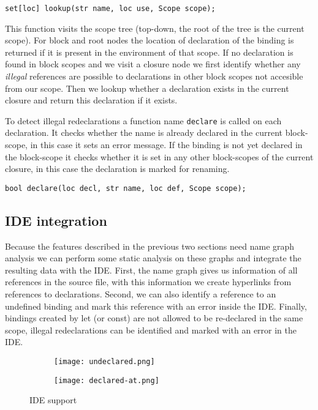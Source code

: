 \begin{lstlisting}[language=rascal]
set[loc] lookup(str name, loc use, Scope scope);
\end{lstlisting}

This function visits the scope tree (top-down, the root of the tree is the current scope). For block and root nodes the location of declaration of the binding is returned if it is present in the environment of that scope. If no declaration is found in block scopes and we visit a closure node we first identify whether any \textit{illegal} references are possible to declarations in other block scopes not accesible from our scope. Then we lookup whether a declaration exists in the current closure and return this declaration if it exists.

To detect illegal redeclarations a function name \lstinline$declare$ is called on each declaration. It checks whether the name is already declared in the current block-scope, in this case it sets an error message. If the binding is not yet declared in the block-scope it checks whether it is set in any other block-scopes of the current closure, in this case the declaration is marked for renaming.

\begin{lstlisting}[language=rascal]
bool declare(loc decl, str name, loc def, Scope scope);
\end{lstlisting}

\subsection{IDE integration}
Because the features described in the previous two sections need name graph analysis we can perform some static analysis on these graphs and integrate the resulting data with the IDE. First, the name graph gives us information of all references in the source file, with this information we create hyperlinks from references to declarations. Second, we can also identify a reference to an undefined binding and mark this reference with an error inside the IDE. Finally, bindings created by let (or const) are not allowed to be re-declared in the same scope, illegal redeclarations can be identified and marked with an error in the IDE.

\begin{figure}
\centering

\begin{subfigure}{.49\textwidth}
	\centering
	\texttt{[image: undeclared.png]}
\end{subfigure}\hfill%
\begin{subfigure}{.49\textwidth}
	\centering	
	\texttt{[image: declared-at.png]}
\end{subfigure}

\caption{IDE support}
\end{figure}